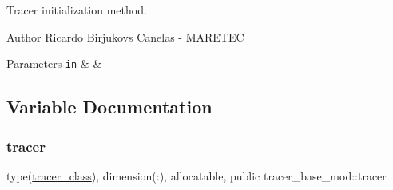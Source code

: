 Tracer initialization method. 

\begin{DoxyAuthor}{Author}
Ricardo Birjukovs Canelas -\/ M\+A\+R\+E\+T\+EC 
\end{DoxyAuthor}

\begin{DoxyParams}[1]{Parameters}
\mbox{\tt in}  & {\em } & \\
\hline
\end{DoxyParams}


\subsection{Variable Documentation}
\mbox{\label{namespacetracer__base__mod_a8e683639ef8cd4f4bdcff33fffe21fc2}} 
\subsubsection{\texorpdfstring{tracer}{tracer}}
{\footnotesize\ttfamily type(\hyperlink{structtracer__base__mod_1_1tracer__class}{tracer\+\_\+class}), dimension(\+:), allocatable, public tracer\+\_\+base\+\_\+mod\+::tracer}

